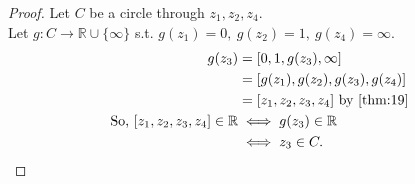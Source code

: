 \begin{proof}
    Let $C$ be a circle through $z_1, z_2, z_4$. \\
    Let $g : C \to \mathbb{R} \cup \{\infty\}$ s.t. $g(z_1) = 0,\ g(z_2) = 1,\ g(z_4) = \infty$.
    \begin{align*}
        g(z_3) &= [0, 1, g(z_3), \infty] \\
        &= [g(z_1), g(z_2), g(z_3), g(z_4)] \\
        &= [z_1, z_2, z_3, z_4] \text{ by \Cref{thm:19}} \\
        \text{So, } [z_1, z_2, z_3, z_4] \in \mathbb{R} &\iff g(z_3) \in \mathbb{R} \\
        &\iff z_3 \in C.
    \end{align*} 
\end{proof} 